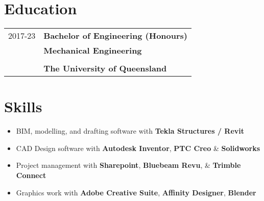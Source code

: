 \documentclass[10pt]{article}
\begin{document}
\section*{Education}
\begin{tabular}{ p{2cm}|p{17cm} } 
    \multirow{1}{*}{2017-23} & \huge\textbf{Bachelor of Engineering (Honours)} \\
    & \Large\textbf{Mechanical Engineering} \\ \\
    & \Large\textbf{The University of Queensland} \\
\end{tabular}


\section*{Skills}
\begin{itemize}
    \setlength\itemsep{0pt}
    \item BIM, modelling, and drafting software with \textbf{Tekla Structures / Revit} 
    \item CAD Design software with \textbf{Autodesk Inventor}, \textbf{PTC Creo} \& \textbf{Solidworks} 
    \item Project management with \textbf{Sharepoint}, \textbf{Bluebeam Revu}, \& \textbf{Trimble Connect} 
    \item Graphics work with \textbf{Adobe Creative Suite}, \textbf{Affinity Designer}, \textbf{Blender} 
\end{itemize}

    

    
\end{document}
